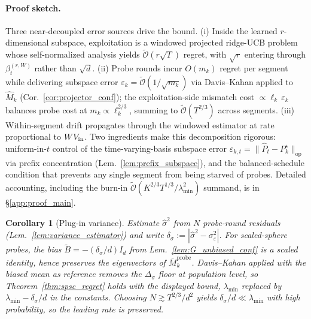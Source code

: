 \documentclass{article}
\newcommand{\op}{\mathrm{op}}
\newcommand{\tilO}{\widetilde{\mathcal{O}}}
\newtheorem{corollary}[theorem]{Corollary}
\begin{document}
\paragraph{Proof sketch.}
Three near-decoupled error sources drive the bound. (i) Inside the
learned $r$-dimensional subspace, exploitation is a windowed
projected ridge-UCB problem whose self-normalized analysis yields
$\tilO(r\sqrt T)$ regret, with $\sqrt r$ entering through
$\beta_t^{(r,W)}$ rather than $\sqrt d$. (ii) Probe rounds incur
$O(m_k)$ regret per segment while delivering subspace error
$\varepsilon_k=\tilO(1/\sqrt{m_k})$ via Davis--Kahan applied to
$\widehat M_k$ (Cor.~\ref{cor:projector_conf}); the
exploitation-side mismatch cost $\propto \ell_k\,\varepsilon_k$
balances probe cost at $m_k\propto \ell_k^{2/3}$, summing to
$\tilO(T^{2/3})$ across segments. (iii) Within-segment drift
propagates through the windowed estimator at rate proportional to
$W V_{\rm in}$. Two ingredients make this decomposition rigorous:
uniform-in-$t$ control of the time-varying-basis subspace error
$\varepsilon_{k,t}=\|\widehat P_t-P_k^\star\|_\op$ via prefix
concentration (Lem.~\ref{lem:prefix_subspace}), and the
balanced-schedule condition that prevents any single segment from
being starved of probes. Detailed accounting, including the burn-in
$\tilO(K^{2/3}T^{1/3}/\lambda_{\min}^2)$ summand, is in
\S\ref{app:proof_main}.

\begin{corollary}[Plug-in variance]
\label{cor:plugin_variance}
Estimate $\widehat\sigma^2$ from $N$ probe-round residuals
(Lem.~\ref{lem:variance_estimator}) and write
$\delta_\sigma:=|\widehat\sigma^2-\sigma_\varepsilon^2|$. For
scaled-sphere probes, the bias
$\widetilde B=-(\delta_\sigma/d)I_d$ from
Lem.~\ref{lem:G_unbiased_conf} is a scaled identity, hence preserves
the eigenvectors of $\bar M_k^{\mathrm{probe}}$. Davis--Kahan applied
with the biased mean as reference removes the
$\Delta_\sigma$ floor at population level, so
Theorem~\ref{thm:spsc_regret} holds with the displayed bound,
$\lambda_{\min}$ replaced by $\lambda_{\min}-\delta_\sigma/d$ in the
constants. Choosing $N\gtrsim T^{2/3}/d^2$ yields
$\delta_\sigma/d\ll\lambda_{\min}$ with high probability, so the
leading rate is preserved.
\end{corollary}
\end{document}
